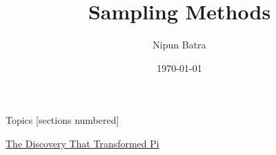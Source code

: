 \documentclass{beamer}
\begin{document}
\title{Sampling Methods}
\author{Nipun Batra}
\date{\today}
\maketitle

\begin{frame}{Topics}
    [sections numbered]
    \tableofcontents

\end{frame}


    \begin{frame}
        \href{https://www.youtube.com/watch?v=gMlf1ELvRzc}{The Discovery That Transformed Pi}
    \end{frame}
\end{document}
